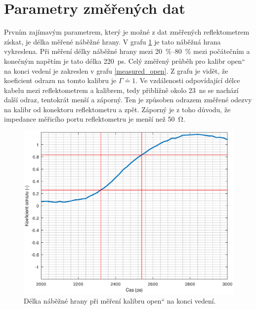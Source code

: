 \section{Parametry změřených dat}
Prvním zajímavým parametrem, který je možné z dat změřených reflektometrem získat, je délka měřené náběžné hrany. V grafu \ref{measured_open_risetime} je tato náběžná hrana vykreslena. Při měření délky náběžné hrany mezi \SIrange{20}{80}{\percent} mezi počátečním a konečným napětím je tato délka \SI{220}{\pico\second}. Celý změřený průběh pro kalibr \quotedblbase open\textquotedblleft{} na konci vedení je zakreslen v grafu \ref{measured_open}. Z grafu je vidět, že koeficient odrazu na tomto kalibru je $\Gamma \doteq 1$. Ve vzdálenosti odpovídající délce kabelu mezi reflektometrem a kalibrem, tedy přibližně okolo \SI{23}{\nano\second} se nachází další odraz, tentokrát menší a záporný. Ten je způsoben odrazem změřené odezvy na kalibr od konektoru reflektometru a zpět. Záporný je z toho důvodu, že impedance měřicího portu reflektometru je menší než \SI{50}{\ohm}.
\begin{figure}[htbp]
\includegraphics[width=\textwidth,keepaspectratio]{images/self-measurements/measure_open_risetime.eps}\caption{Délka náběžné hrany při měření kalibru \quotedblbase open\textquotedblleft{} na konci vedení.}\label{measured_open_risetime}
\end{figure}

